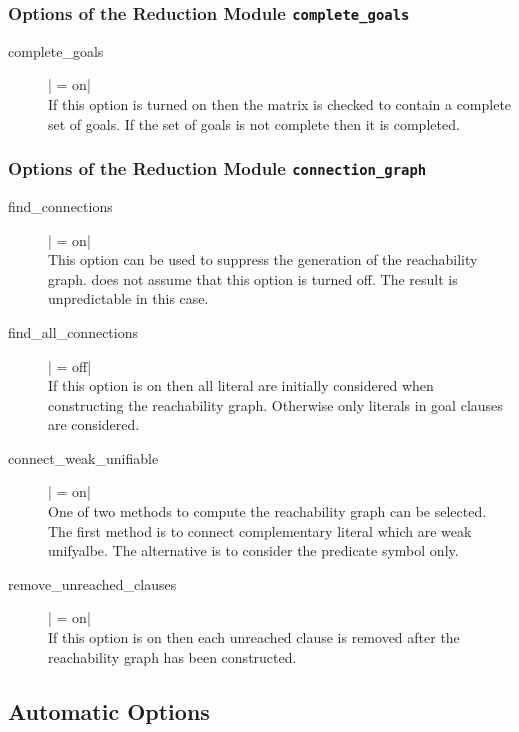 \subsubsection{Options of the Reduction Module {\tt complete\_goals}}

\begin{description}

  \item [complete\_goals] | = on|\\
  If this option is turned on then the matrix is checked to contain a
  complete set of goals. If the set of goals is not complete then it is
  completed.

\end{description}

\subsubsection{Options of the Reduction Module {\tt connection\_graph}}

\begin{description}

  \item [find\_connections] | = on|\\
  This option can be used to suppress the generation of the reachability
  graph. \ProCom{} does not assume that this option is turned off. The
  result is unpredictable in this case.

  \item [find\_all\_connections] | = off|\\
  If this option is on then all literal are initially considered when
  constructing the reachability graph. Otherwise only literals in goal
  clauses are considered.

  \item [connect\_weak\_unifiable] | = on|\\
  One of two methods to compute the reachability graph can be selected.  The
  first method is to connect complementary literal which are weak
  unifyalbe. The alternative is to consider the predicate symbol only.

  \item [remove\_unreached\_clauses] | = on|\\
  If this option is on then each unreached clause is removed after the
  reachability graph has been constructed.

\end{description}


\subsection{Automatic Options}

